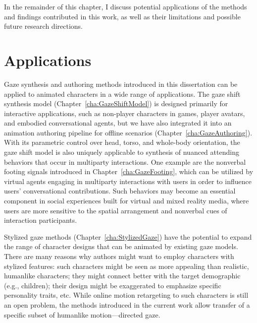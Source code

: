 In the remainder of this chapter, I discuss potential applications of the methods and findings contributed in this work, as well as their limitations and possible future research directions.

\section{Applications}

Gaze synthesis and authoring methods introduced in this dissertation can be applied to animated characters in a wide range of applications. The gaze shift synthesis model (Chapter~\ref{cha:GazeShiftModel}) is designed primarily for interactive applications, such as non-player characters in games, player avatars, and embodied conversational agents, but we have also integrated it into an animation authoring pipeline for offline scenarios (Chapter~\ref{cha:GazeAuthoring}).
With its parametric control over head, torso, and whole-body orientation, the gaze shift model is also uniquely applicable to synthesis of nuanced attending behaviors that occur in multiparty interactions. One example are the nonverbal footing signals introduced in Chapter~\ref{cha:GazeFooting}, which can be utilized by virtual agents engaging in multiparty interactions with users in order to influence users' conversational contributions. Such behaviors may become an essential component in social experiences built for virtual and mixed reality media, where users are more sensitive to the spatial arrangement and nonverbal cues of interaction participants.

Stylized gaze methods (Chapter~\ref{cha:StylizedGaze}) have the potential to expand the range of character designs that can be animated by existing gaze models. There are many reasons why authors might want to employ characters with stylized features: such characters might be seen as more appealing than realistic, humanlike characters; they might connect better with the target demographic (e.g., children); their design might be exaggerated to emphasize specific personality traits, etc. While online motion retargeting to such characters is still an open problem, the methods introduced in the current work allow transfer of a specific subset of humanlike motion---directed gaze.

